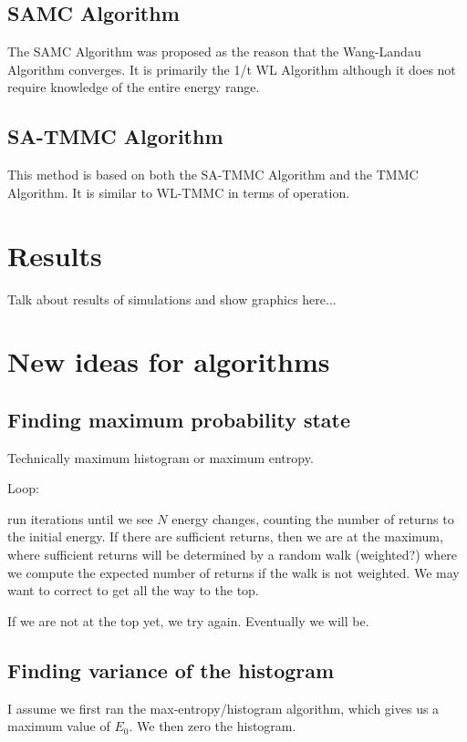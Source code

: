 \documentclass[letterpaper,twocolumn,amsmath,amssymb,pre,aps,10pt]{revtex4-1}
\begin{document}
\subsection{SAMC Algorithm}
The SAMC Algorithm was proposed as the reason that the Wang-Landau Algorithm converges.  It is primarily the 1/t WL Algorithm although it does not require knowledge of the entire energy range.


\subsection{SA-TMMC Algorithm}

This method is based on both the SA-TMMC Algorithm and the TMMC Algorithm.  It is similar to WL-TMMC in terms of operation.




\section{Results}

Talk about results of simulations and show graphics here...


\section{New ideas for algorithms}

\subsection{Finding maximum probability state}

Technically maximum histogram or maximum entropy.

Loop:

run iterations until we see $N$ energy changes, counting the number of
returns to the initial energy.  If there are sufficient returns, then
we are at the maximum, where sufficient returns will be determined by
a random walk (weighted?) where we compute the expected number of
returns if the walk is not weighted.  We may want to correct to get
all the way to the top.

If we are not at the top yet, we try again.  Eventually we will be.

\subsection{Finding variance of the histogram}

I assume we first ran the max-entropy/histogram algorithm, which gives
us a maximum value of $E_0$.  We then zero the histogram.
\end{document}
